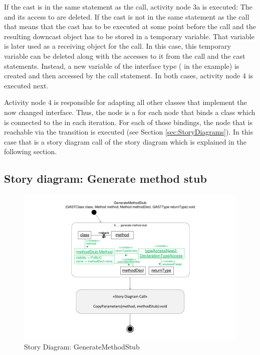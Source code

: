 If the cast is in the same statement as the call, activity node 3a is executed: The  and its access to  are deleted. If the cast is not in the same statement as the call that means that the cast has to be executed at some point before the call and the resulting downcast object has to be stored in a temporary variable. That variable is later used as a receiving object for the call. In this case, this temporary variable can be deleted along with the accesses to it from the call and the cast statements. Instead, a new variable of the interface type ( in the example) is created and then accessed by the call statement. In both cases, activity node 4 is executed next.

Activity node 4 is responsible for adapting all other classes that implement the now changed interface. Thus, the node is a for each node that binds a class which is connected to the  in each iteration. For each of those bindings, the node that is reachable via the  transition is executed (see Section \ref{sec:StoryDiagrams}). In this case that is a story diagram call of the story diagram  which is explained in the following section.

\subsection{Story diagram: Generate method stub}

\begin{figure}[hbtp]
\centering
\includegraphics[width=\linewidth]{./figures/SDGenerateMethodStub}
\caption{Story Diagram: GenerateMethodStub}
\label{fig:SDGenerateMethodStub}
\end{figure}

